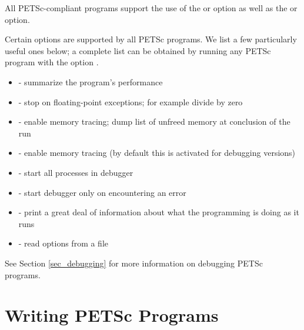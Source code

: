 All PETSc-compliant programs support the use of the 
 or  option as well as the  
or  option.


Certain options are supported by all PETSc programs.  We list a few
particularly useful ones below; a complete list can be obtained by
running any PETSc program with the option .
\begin{itemize}
\item {} - summarize the program's performance
\item {} - stop on floating-point exceptions; 
      for example divide by zero
\item {} - enable memory tracing; dump list of unfreed memory
      at conclusion  of the run
\item {} - enable memory tracing (by default this is
      activated for debugging versions)
\item {}  
     - start all processes in debugger  
\item {}  
       - start debugger only on encountering an error
\item {} - print a great deal of information about what the programming is doing as it runs
\item {}  - read options from a file
\end{itemize}
See Section \ref{sec_debugging} for more information on debugging PETSc programs.

\section{Writing PETSc Programs}
\label{sec_writing}

